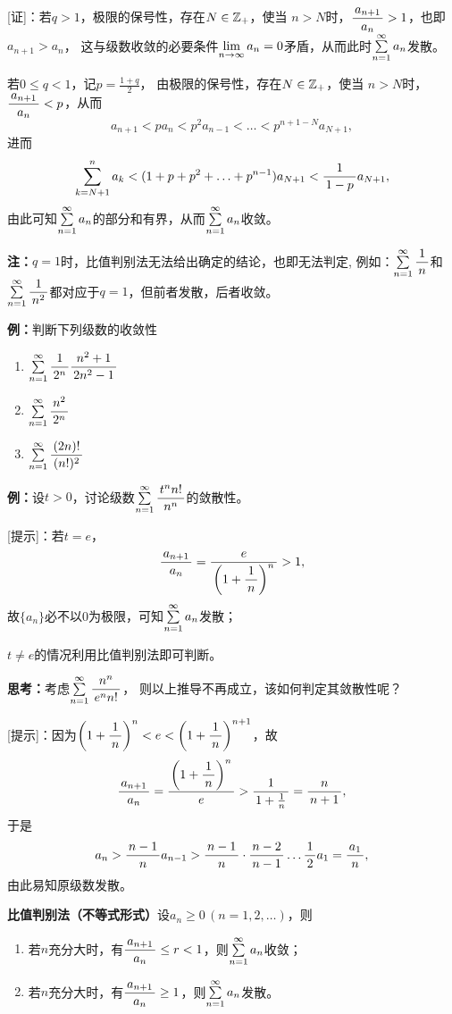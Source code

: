 [证]：若$q>1$，极限的保号性，存在$N\in\mbb{Z}_+$，使当
$n>N$时，$\df{a_{n+1}}{a_n}>1$，也即$a_{n+1}>a_n$，
这与级数收敛的必要条件$\limn a_n=0$矛盾，从而此时$\sumn a_n$发散。

若$0\leq q<1$，记$p=\frac{1+q}2$，
由极限的保号性，存在$N\in\mbb{Z}_+$，使当
$n>N$时，$\df{a_{n+1}}{a_n}<p$，从而
$$a_{n+1}<p{a_n}<p^2a_{n-1}<\ldots<p^{n+1-N}a_{N+1},$$
进而
$$\sum\limits_{k=N+1}^{n}a_k<(1+p+p^2+\ldots+p^{n-1})a_{N+1}
<\df1{1-p}a_{N+1},$$
由此可知$\sumn a_n$的部分和有界，从而$\sumn a_n$收敛。\fin

{\bf 注：}$q=1$时，比值判别法无法给出确定的结论，也即{\kaishu 无法判定},
例如：$\sumn\df 1n$和$\sumn\df 1{n^2}$都对应于$q=1$，但前者发散，后者收敛。

{\bf 例：}判断下列级数的收敛性
\begin{enumerate} [(1)]
  \setlength{\itemindent}{1cm}
  \item $\sumn\df 1{2^n}\df{n^2+1}{2n^2-1}$ 
  \item $\sumn\df{n^2}{2^n}$ 
  \item $\sumn\df{(2n)!}{(n!)^2}$
\end{enumerate}

{\bf 例：}设$t>0$，讨论级数$\sumn\df{t^nn!}{n^n}$的敛散性。

[提示]：若$t=e$，
$$\df{a_{n+1}}{a_n}=\df{e}{\left(1+\df1n\right)^n}>1,$$
故$\{a_n\}$必不以$0$为极限，可知$\sumn a_n$发散；

$t\ne e$的情况利用比值判别法即可判断。

{\bf 思考：}考虑$\sumn\df{n^n}{e^nn!}$，
则以上推导不再成立，该如何判定其敛散性呢？

[提示]：因为$\left(1+\df1n\right)^n<e<\left(1+\df1n\right)^{n+1}$，故
$$\df{a_{n+1}}{a_n}=\df{\left(1+\df1n\right)^n}{e}>\df1{1+\frac1n}=\df n{n+1},$$
于是
$$a_n>\df{n-1}na_{n-1}>\df{n-1}n\cdot\df{n-2}{n-1}\ldots\df12a_1=\df{a_1}n,$$
由此易知原级数发散。

\begin{thx}
	{\bf 比值判别法（不等式形式）}设$a_n\geq 0\,(n=1,2,\ldots)$，则 
	\begin{enumerate}
	  \item 若$n$充分大时，有$\df{a_{n+1}}{a_n}\leq r<1$，则$\sumn a_n$收敛； 
	  \item 若$n$充分大时，有$\df{a_{n+1}}{a_n}\geq 1$，则$\sumn a_n$发散。
	\end{enumerate}
\end{thx}

